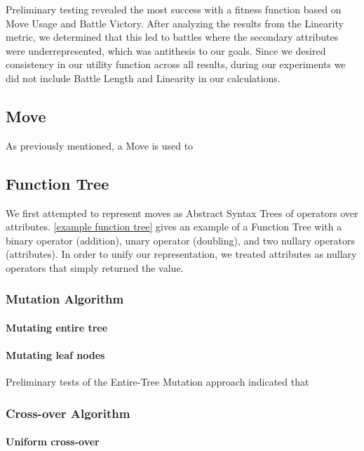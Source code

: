 \documentclass{acm_proc_article-sp}
\begin{document}
Preliminary testing revealed the most success with a fitness function based on Move Usage and Battle Victory. After analyzing the results from the Linearity metric, we determined that this led to battles where the secondary attributes were underrepresented, which was antithesis to our goals. Since we desired consistency in our utility function across all results, during our experiments we did not include Battle Length and Linearity in our calculations.

\subsection{Move}

As previously mentioned, a Move is used to 

\subsection{Function Tree}

We first attempted to represent moves as Abstract Syntax Trees of operators over attributes. \ref{example function tree} gives an example of a Function Tree with a binary operator (addition), unary operator (doubling), and two nullary operators (attributes). In order to unify our representation, we treated attributes as nullary operators that simply returned the value.

\subsubsection{Mutation Algorithm}

\paragraph{Mutating entire tree}

\paragraph{Mutating leaf nodes}

Preliminary tests of the Entire-Tree Mutation approach indicated that 

\subsubsection{Cross-over Algorithm}

\paragraph{Uniform cross-over}
\end{document}
